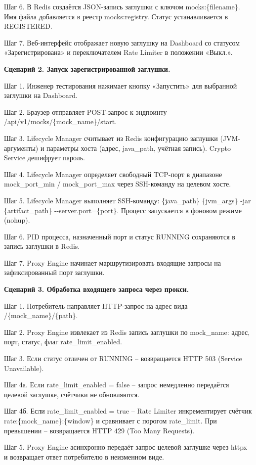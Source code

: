 \documentclass[
]{article}
\begin{document}
Шаг 6. В Redis создаётся JSON-запись заглушки с ключом
mocks:\{filename\}. Имя файла добавляется в реестр mocks:registry.
Статус устанавливается в REGISTERED.

Шаг 7. Веб-интерфейс отображает новую заглушку на Dashboard со статусом
«Зарегистрирована» и переключателем Rate Limiter в положении «Выкл.».

\textbf{Сценарий 2. Запуск зарегистрированной заглушки.}

Шаг 1. Инженер тестирования нажимает кнопку «Запустить» для выбранной
заглушки на Dashboard.

Шаг 2. Браузер отправляет POST-запрос к эндпоинту
/api/v1/mocks/\{mock\_name\}/start.

Шаг 3. Lifecycle Manager считывает из Redis конфигурацию заглушки
(JVM-аргументы) и параметры хоста (адрес, java\_path, учётная запись).
Crypto Service дешифрует пароль.

Шаг 4. Lifecycle Manager определяет свободный TCP-порт в диапазоне
mock\_port\_min / mock\_port\_max через SSH-команду на целевом хосте.

Шаг 5. Lifecycle Manager выполняет SSH-команду: \{java\_path\}
\{jvm\_args\} -jar \{artifact\_path\} -\/-server.port=\{port\}. Процесс
запускается в фоновом режиме (nohup).

Шаг 6. PID процесса, назначенный порт и статус RUNNING сохраняются в
запись заглушки в Redis.

Шаг 7. Proxy Engine начинает маршрутизировать входящие запросы на
зафиксированный порт заглушки.

\textbf{Сценарий 3. Обработка входящего запроса через прокси.}

Шаг 1. Потребитель направляет HTTP-запрос на адрес вида
/\{mock\_name\}/\{path\}.

Шаг 2. Proxy Engine извлекает из Redis запись заглушки по mock\_name:
адрес, порт, статус, флаг rate\_limit\_enabled.

Шаг 3. Если статус отличен от RUNNING -- возвращается HTTP 503 (Service
Unavailable).

Шаг 4а. Если rate\_limit\_enabled = false -- запрос немедленно
передаётся целевой заглушке, счётчики не обновляются.

Шаг 4б. Если rate\_limit\_enabled = true -- Rate Limiter инкрементирует
счётчик rate:\{mock\_name\}:\{window\} и сравнивает с порогом
rate\_limit. При превышении -- возвращается HTTP 429 (Too Many
Requests).

Шаг 5. Proxy Engine асинхронно передаёт запрос целевой заглушке через
httpx и возвращает ответ потребителю в неизменном виде.
\end{document}
